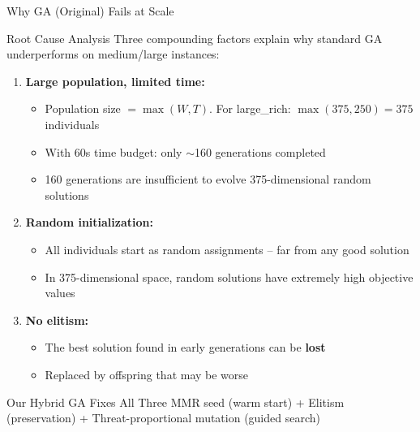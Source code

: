 \documentclass[aspectratio=43,8pt]{beamer}
\begin{document}
\begin{frame}{Why GA (Original) Fails at Scale}
\begin{alertblock}{Root Cause Analysis}
Three compounding factors explain why standard GA underperforms on medium/large instances:
\end{alertblock}

\vspace{0.2cm}
\begin{enumerate}
    \item \textbf{Large population, limited time:}
    \begin{itemize}
        \item Population size $= \max(W, T)$. For large\_rich: $\max(375, 250) = 375$ individuals
        \item With 60s time budget: only $\sim$160 generations completed
        \item 160 generations are insufficient to evolve 375-dimensional random solutions
    \end{itemize}

    \item \textbf{Random initialization:}
    \begin{itemize}
        \item All individuals start as random assignments -- far from any good solution
        \item In 375-dimensional space, random solutions have extremely high objective values
    \end{itemize}

    \item \textbf{No elitism:}
    \begin{itemize}
        \item The best solution found in early generations can be \textbf{lost}
        \item Replaced by offspring that may be worse
    \end{itemize}
\end{enumerate}

\vspace{0.2cm}
\begin{block}{Our Hybrid GA Fixes All Three}
MMR seed (warm start) + Elitism (preservation) + Threat-proportional mutation (guided search)
\end{block}
\end{frame}
\end{document}
